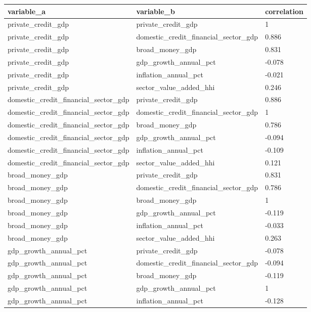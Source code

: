 ﻿%
\begin{tabular}{lll}
\hline
variable_a & variable_b & correlation \\
\hline
private\_credit\_gdp & private\_credit\_gdp & 1 \\
private\_credit\_gdp & domestic\_credit\_financial\_sector\_gdp & 0.886 \\
private\_credit\_gdp & broad\_money\_gdp & 0.831 \\
private\_credit\_gdp & gdp\_growth\_annual\_pct & -0.078 \\
private\_credit\_gdp & inflation\_annual\_pct & -0.021 \\
private\_credit\_gdp & sector\_value\_added\_hhi & 0.246 \\
domestic\_credit\_financial\_sector\_gdp & private\_credit\_gdp & 0.886 \\
domestic\_credit\_financial\_sector\_gdp & domestic\_credit\_financial\_sector\_gdp & 1 \\
domestic\_credit\_financial\_sector\_gdp & broad\_money\_gdp & 0.786 \\
domestic\_credit\_financial\_sector\_gdp & gdp\_growth\_annual\_pct & -0.094 \\
domestic\_credit\_financial\_sector\_gdp & inflation\_annual\_pct & -0.109 \\
domestic\_credit\_financial\_sector\_gdp & sector\_value\_added\_hhi & 0.121 \\
broad\_money\_gdp & private\_credit\_gdp & 0.831 \\
broad\_money\_gdp & domestic\_credit\_financial\_sector\_gdp & 0.786 \\
broad\_money\_gdp & broad\_money\_gdp & 1 \\
broad\_money\_gdp & gdp\_growth\_annual\_pct & -0.119 \\
broad\_money\_gdp & inflation\_annual\_pct & -0.033 \\
broad\_money\_gdp & sector\_value\_added\_hhi & 0.263 \\
gdp\_growth\_annual\_pct & private\_credit\_gdp & -0.078 \\
gdp\_growth\_annual\_pct & domestic\_credit\_financial\_sector\_gdp & -0.094 \\
gdp\_growth\_annual\_pct & broad\_money\_gdp & -0.119 \\
gdp\_growth\_annual\_pct & gdp\_growth\_annual\_pct & 1 \\
gdp\_growth\_annual\_pct & inflation\_annual\_pct & -0.128 \\

\end{tabular}
